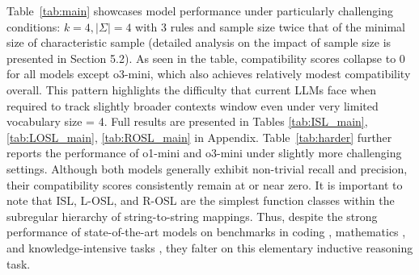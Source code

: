 Table~\ref{tab:main} showcases model performance under particularly challenging conditions: $k=4, |\Sigma| = 4$ with 3 rules and sample size twice that of the minimal size of characteristic sample (detailed analysis on the impact of sample size is presented in Section 5.2). As seen in the table, compatibility scores collapse to 0 for all models except o3-mini, which also achieves relatively modest compatibility overall. This pattern highlights the difficulty that current LLMs face when required to track slightly broader contexts window even under very limited vocabulary size = 4. Full results are presented in Tables \ref{tab:ISL_main}, \ref{tab:LOSL_main}, \ref{tab:ROSL_main} in Appendix. Table~\ref{tab:harder} further reports the performance of o1-mini and o3-mini under slightly more challenging settings. Although both models generally exhibit non-trivial recall and precision, their compatibility scores consistently remain at or near zero. It is important to note that ISL, L-OSL, and R-OSL are the simplest function classes within the subregular hierarchy of string-to-string mappings. Thus, despite the strong performance of state-of-the-art models on benchmarks in coding \citep{jain2024livecodebench}, mathematics \citep{mirzadeh2024gsm}, and knowledge-intensive tasks \citep{wang2024mmlu}, they falter on this elementary inductive reasoning task. 

